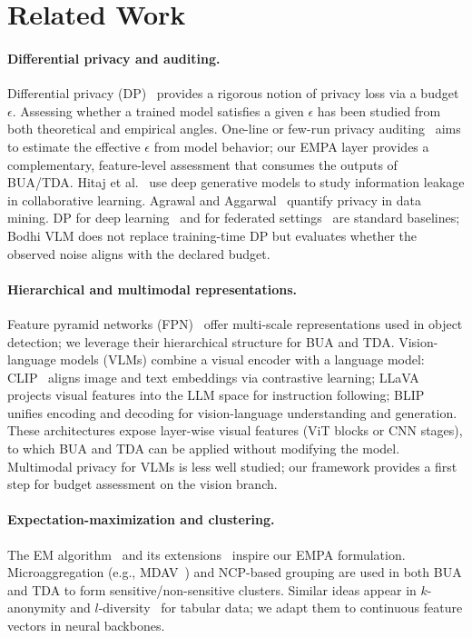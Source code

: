 \documentclass[journal]{IEEEtran}
\begin{document}
\section{Related Work}
\label{sec:related}

\paragraph{Differential privacy and auditing.}
Differential privacy (DP)~\cite{dwork2008differential} provides a rigorous notion of privacy loss via a budget $\epsilon$. Assessing whether a trained model satisfies a given $\epsilon$ has been studied from both theoretical and empirical angles. One-line or few-run privacy auditing~\cite{narayanan2021rethinking,jagielski2022differentially} aims to estimate the effective $\epsilon$ from model behavior; our EMPA layer provides a complementary, feature-level assessment that consumes the outputs of BUA/TDA. Hitaj et al.~\cite{hitaj2017deep} use deep generative models to study information leakage in collaborative learning. Agrawal and Aggarwal~\cite{agrawal2001design} quantify privacy in data mining. DP for deep learning~\cite{abadi2016deep} and for federated settings~\cite{mcmahan2017communication} are standard baselines; Bodhi VLM does not replace training-time DP but evaluates whether the observed noise aligns with the declared budget.

\paragraph{Hierarchical and multimodal representations.}
Feature pyramid networks (FPN)~\cite{lin2017feature} offer multi-scale representations used in object detection; we leverage their hierarchical structure for BUA and TDA. Vision-language models (VLMs) combine a visual encoder with a language model: CLIP~\cite{radford2021learning} aligns image and text embeddings via contrastive learning; LLaVA~\cite{liu2023llava} projects visual features into the LLM space for instruction following; BLIP~\cite{li2022blip} unifies encoding and decoding for vision-language understanding and generation. These architectures expose layer-wise visual features (ViT blocks or CNN stages), to which BUA and TDA can be applied without modifying the model. Multimodal privacy for VLMs is less well studied; our framework provides a first step for budget assessment on the vision branch.

\paragraph{Expectation-maximization and clustering.}
The EM algorithm~\cite{dempster-laird-rubin-77} and its extensions~\cite{em-converge,greff2017neural} inspire our EMPA formulation. Microaggregation (e.g., MDAV~\cite{soria2014enhancing}) and NCP-based grouping are used in both BUA and TDA to form sensitive/non-sensitive clusters. Similar ideas appear in $k$-anonymity and $l$-diversity~\cite{machanavajjhala2007diversity} for tabular data; we adapt them to continuous feature vectors in neural backbones.
\end{document}
